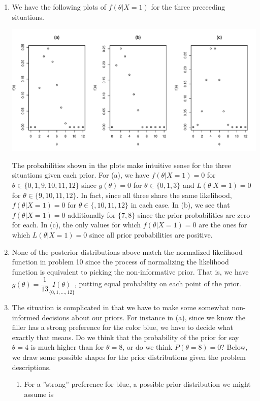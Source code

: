 \documentclass[12pt]{article}\usepackage[]{graphicx}\usepackage[]{color}
\makeatletter
\def\maxwidth{ %
  \ifdim\Gin@nat@width>\linewidth
    \linewidth
  \else
    \Gin@nat@width
  \fi
}
\newenvironment{knitrout}{}{} %
\makeatother
\begin{document}
\begin{enumerate}
\item We have the following plots of $f(\theta | X=1)$ for the three preceeding situations. 

\begin{knitrout}
\color{fgcolor}

{\centering \includegraphics[width=\maxwidth]{figure/plot15-1} 

}



\end{knitrout}

The probabilities shown in the plots make intuitive sense for the three situations given each prior. For (a), we have $f(\theta | X=1) = 0$ for $\theta \in \{ 0, 1, 9, 10, 11, 12\}$ since $g(\theta) = 0$ for $\theta \in \{0, 1, 3 \}$ and $L(\theta | X=1) = 0$ for $\theta \in \{9, 10, 11, 12 \}$. In fact, since all three share the same likelihood, $f(\theta | X=1) = 0$ for $\theta \in \{,  10, 11, 12 \}$ in each case. In (b), we see that $f(\theta | X=1) = 0$ additionally for $\{ 7, 8\}$ since the prior probabilities are zero for each. In (c), the only values for which  $f(\theta | X=1) = 0$ are the ones for which $L(\theta | X=1) = 0$  since all prior probabilities are positive.

\item None of the posterior distributions above match the normalized likelihood function in problem 10 since the process of normalizing the likelihood function is equivalent to picking the non-informative prior. That is, we have $g(\theta) = \dfrac{1}{13} \underset{\{0, 1, \dots, 12 \}}{I(\theta)}$, putting equal probability on each point of the prior. 

\item The situation is complicated in that we have to make some somewhat non-informed decisions about our priors. For instance in (a), since we know the filler has a strong preference for the color blue, we have to decide what exactly that means. Do we think that the probability of the prior for say $\theta =4$ is much higher than for $\theta =8$, or do we think $P(\theta = 8) = 0$? Below, we draw some possible shapes for the prior distributions given the problem descriptions. 
\begin{enumerate}[label=(\alph*)]
\item For a ''strong'' preference for blue, a possible prior distribution we might assume is
\begin{knitrout}
\color{fgcolor}


\end{knitrout}
\end{enumerate}
\end{enumerate}
\end{document}
